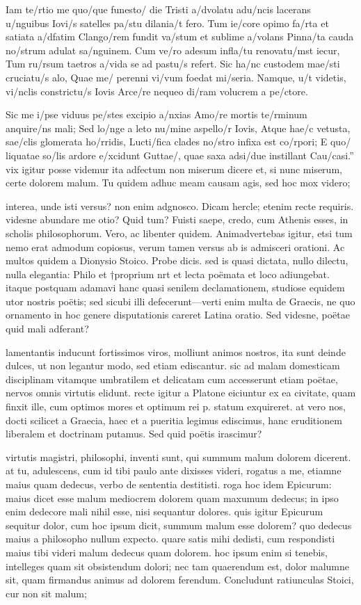  Iam te/rtio me quo/que funesto/ die Tristi a/dvolatu adu/ncis lacerans u/nguibus Iovi/s satelles pa/stu dilania/t fero. Tum ie/core opimo fa/rta et satiata a/dfatim Clango/rem fundit va/stum et sublime a/volans Pinna/ta cauda no/strum adulat sa/nguinem. Cum ve/ro adesum infla/tu renovatu/mst iecur, Tum ru/rsum taetros a/vida se ad pastu/s refert. Sic ha/nc custodem mae/sti cruciatu/s alo, Quae me/ perenni vi/vum foedat mi/seria. Namque, u/t videtis, vi/nclis constrictu/s Iovis Arce/re nequeo di/ram volucrem a pe/ctore.

 Sic me i/pse viduus pe/stes excipio a/nxias Amo/re mortis te/rminum anquire/ns mali; Sed lo/nge a leto nu/mine aspello/r Iovis, Atque hae/c vetusta, sae/clis glomerata ho/rridis, Lucti/fica clades no/stro infixa est co/rpori; E quo/ liquatae so/lis ardore e/xcidunt Guttae/, quae saxa adsi/due instillant Cau/casi.'' vix igitur posse videmur ita adfectum non miserum dicere et, si nunc miserum, certe dolorem malum. Tu quidem adhuc meam causam agis, sed hoc mox videro;

 interea, unde isti versus? non enim adgnosco. Dicam hercle; etenim recte requiris. videsne abundare me otio? Quid tum? Fuisti saepe, credo, cum Athenis esses, in scholis philosophorum. Vero, ac libenter quidem. Animadvertebas igitur, etsi tum nemo erat admodum copiosus, verum tamen versus ab is admisceri orationi. Ac multos quidem a Dionysio Stoico. Probe dicis. sed is quasi dictata, nullo dilectu, nulla elegantia: Philo et †proprium nrt et lecta poëmata et loco adiungebat. itaque postquam adamavi hanc quasi senilem declamationem, studiose equidem utor nostris poëtis; sed sicubi illi defecerunt—verti enim multa de Graecis, ne quo ornamento in hoc genere disputationis careret Latina oratio. Sed videsne, poëtae quid mali adferant?

 lamentantis inducunt fortissimos viros, molliunt animos nostros, ita sunt deinde dulces, ut non legantur modo, sed etiam ediscantur. sic ad malam domesticam disciplinam vitamque umbratilem et delicatam cum accesserunt etiam poëtae, nervos omnis virtutis elidunt. recte igitur a Platone eiciuntur ex ea civitate, quam finxit ille, cum optimos mores et optimum rei p. statum exquireret. at vero nos, docti scilicet a Graecia, haec et a pueritia legimus ediscimus, hanc eruditionem liberalem et doctrinam putamus. Sed quid poëtis irascimur?

 virtutis magistri, philosophi, inventi sunt, qui summum malum dolorem dicerent. at tu, adulescens, cum id tibi paulo ante dixisses videri, rogatus a me, etiamne maius quam dedecus, verbo de sententia destitisti. roga hoc idem Epicurum: maius dicet esse malum mediocrem dolorem quam maxumum dedecus; in ipso enim dedecore mali nihil esse, nisi sequantur dolores. quis igitur Epicurum sequitur dolor, cum hoc ipsum dicit, summum malum esse dolorem? quo dedecus maius a philosopho nullum expecto. quare satis mihi dedisti, cum respondisti maius tibi videri malum dedecus quam dolorem. hoc ipsum enim si tenebis, intelleges quam sit obsistendum dolori; nec tam quaerendum est, dolor malumne sit, quam firmandus animus ad dolorem ferendum. Concludunt ratiunculas Stoici, cur non sit malum;

